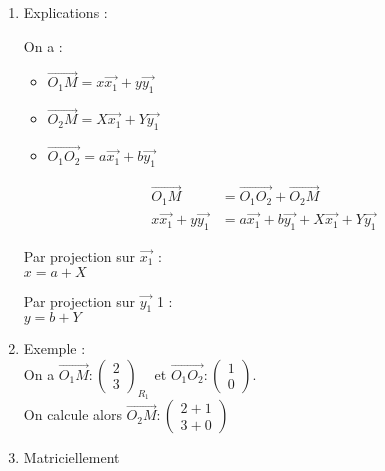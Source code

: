 \documentclass[11]{article}
\newcommand\coordo[2]{\begin{pmatrix} #1 \\#2 \end{pmatrix}}
\begin{document}
\begin{enumerate}
\begin{enumerate}
\item Explications  : \\


\begin{multicols}{2}
\begin{minipage}{23em}
On a : 
\begin{itemize}
\item $\overrightarrow{O_1M}=x\overrightarrow{x_1}+y\overrightarrow{y_1}$
\item $\overrightarrow{O_2M}=X\overrightarrow{x_1}+Y\overrightarrow{y_1}$
\item $\overrightarrow{O_1O_2}=a\overrightarrow{x_1}+b\overrightarrow{y_1}$
\end{itemize}
\end{minipage}
\begin{minipage}{15em}
\vspace{2\baselineskip}
\begin{align*}
\overrightarrow{O_1M} &= \overrightarrow{O_1O_2} + \overrightarrow{O_2M} \\
x\overrightarrow{x_1}+y\overrightarrow{y_1} &=a\overrightarrow{x_1}+b\overrightarrow{y_1} + X\overrightarrow{x_1}+Y\overrightarrow{y_1}
\end{align*}
\end{minipage}
\end{multicols}
\vspace{1\baselineskip}


\begin{multicols}{2}
\begin{minipage}{23em}
Par projection sur $\overrightarrow{x_1}$  : \\
 $x = a+X$
\end{minipage}
\begin{minipage}{15em}
Par projection sur $\overrightarrow{y_1}$ 1 : \\
 $y = b+Y$
\end{minipage}
\end{multicols}



\item Exemple  : \\

On a $\overrightarrow{O_1M}:\coordo{2}{3}_{R_1}$ et $\overrightarrow{O_1O_2}:\coordo{1}{0}$. \\

On calcule alors $\overrightarrow{O_2M}:\coordo{2+1}{3+0}$

\item Matriciellement 


\end{enumerate}
\end{enumerate}
\end{document}
